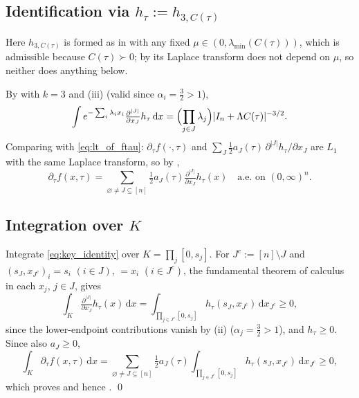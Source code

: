 \documentclass[12pt,a4paper]{article}
\theoremstyle{definition}
\newcommand{\dd}{\mathrm{d}}
\begin{document}
\subsection{Identification via \texorpdfstring{$h_\tau:=h_{3,C(\tau)}$}{h(tau) = h(3,C(tau))}}

Here $h_{3,C(\tau)}$ is formed as in  with any fixed
$\mu\in(0,\lambda_{\min}(C(\tau)))$, which is admissible because
$C(\tau)\succ 0$; by  its Laplace transform does not
depend on $\mu$, so neither does anything below.

By  with $k=3$ and (iii) (valid
since $\alpha_i=\tfrac{3}{2}>1$),
\[
  \int e^{-\sum_i\lambda_ix_i}
    \tfrac{\partial^{|J|}}{\partial x_J}h_\tau\,\dd x
  =\Bigl(\prod_{j\in J}\lambda_j\Bigr)|I_n+\Lambda C(\tau)|^{-3/2}.
\]
Comparing with \eqref{eq:lt_of_ftau}: $\partial_\tau f(\cdot,\tau)$
and $\sum_J\tfrac12 a_J(\tau)\,\partial^{|J|}h_\tau/\partial x_J$ are
$L_1$ with the same Laplace transform, so by ,
\begin{equation}\label{eq:key_identity}
  \partial_\tau f(x,\tau)
  =\sum_{\varnothing\ne J\subseteq[n]}
    \tfrac{1}{2}a_J(\tau)
    \tfrac{\partial^{|J|}}{\partial x_J}h_\tau(x)
  \quad\text{a.e.\ on }(0,\infty)^n.
\end{equation}

\subsection{Integration over \texorpdfstring{$K$}{K}}

Integrate \eqref{eq:key_identity} over $K=\prod_j[0,s_j]$.
For $J^c:=[n]\setminus J$ and $(s_J,x_{J^c})_i=s_i$ $(i\in J)$,
$=x_i$ $(i\in J^c)$, the fundamental theorem of calculus in each
$x_j$, $j\in J$, gives
\begin{equation}\label{eq:boundary_eval}
  \int_K\tfrac{\partial^{|J|}}{\partial x_J}h_\tau(x)\,\dd x
  =\int_{\prod_{j\in J^c}[0,s_j]}h_\tau(s_J,x_{J^c})\,\dd x_{J^c}
  \geqslant 0,
\end{equation}
since the lower-endpoint contributions vanish by
(ii) ($\alpha_j=\tfrac{3}{2}>1$), and
$h_\tau\geqslant 0$.  Since also $a_J\geqslant 0$,
\[
  \int_K\partial_\tau f(x,\tau)\,\dd x
  =\sum_{\varnothing\ne J\subseteq[n]}\tfrac{1}{2}a_J(\tau)
  \int_{\prod_{j\in J^c}[0,s_j]}h_\tau(s_J,x_{J^c})\,\dd x_{J^c}
  \geqslant 0,
\]
which proves  and hence .  \qed


\end{document}

